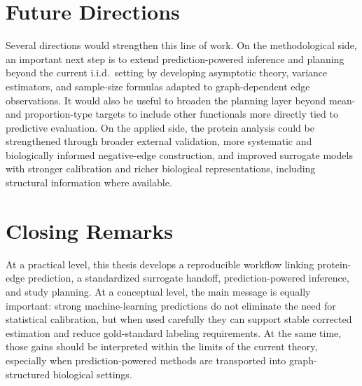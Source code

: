 \section{Future Directions}

Several directions would strengthen this line of work. On the methodological side, an important next step is to extend prediction-powered inference and planning beyond the current i.i.d.\ setting by developing asymptotic theory, variance estimators, and sample-size formulas adapted to graph-dependent edge observations. It would also be useful to broaden the planning layer beyond mean- and proportion-type targets to include other functionals more directly tied to predictive evaluation. On the applied side, the protein analysis could be strengthened through broader external validation, more systematic and biologically informed negative-edge construction, and improved surrogate models with stronger calibration and richer biological representations, including structural information where available.


\section{Closing Remarks}

At a practical level, this thesis develops a reproducible workflow linking protein-edge prediction, a standardized surrogate handoff, prediction-powered inference, and study planning. At a conceptual level, the main message is equally important: strong machine-learning predictions do not eliminate the need for statistical calibration, but when used carefully they can support stable corrected estimation and reduce gold-standard labeling requirements. At the same time, those gains should be interpreted within the limits of the current theory, especially when prediction-powered methods are transported into graph-structured biological settings.
